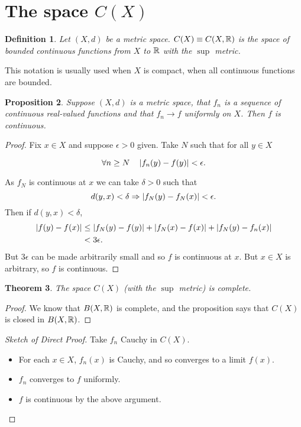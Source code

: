 \documentclass{notes}
\theoremstyle{plain}
\newtheorem{proposition}{Proposition}[chapter]
\newtheorem{theorem}[proposition]{Theorem}
\newtheorem{definition}[proposition]{Definition}
\newcommand{\Forall}[1]{\forall #1 \quad}
\begin{document}
\section{The space $C(X)$}

\begin{definition}
Let $ (X,d) $ be a metric space.
$ C(X) \equiv C(X,\mathbb{R}) $ is the space of bounded continuous functions 
from $ X $ to $ \mathbb{R} $ with the $ \sup $ metric.
\end{definition}

This notation is usually used when $ X $ is compact, when all 
continuous functions are bounded.

\begin{proposition}
Suppose $ (X,d) $ is a metric space, that $ f_{n} $ is a sequence 
of continuous real-valued functions and that $ f_{n} \to f $ 
uniformly on $ X $.  Then $ f $ is continuous.
\end{proposition}

\begin{proof}
Fix $ x \in X $ and suppose $ \epsilon > 0 $ given.
Take $ N $ such that for all $ y \in X $

\[
\Forall{n \geq N} \abs{f_{n}(y)-f(y)}< \epsilon.
\]

As $f_{N}$ is continuous at $x$ we can take $ \delta>0 $ 
such that
\[ d(y,x)< \delta \Rightarrow \left|f_{N}(y)-f_{N}(x)\right|<\epsilon. \]
Then if $ d(y,x)<\delta $,
\begin{align*}
\left|f(y)-f(x)\right| & \leq \left|f_{N}(y)-f(y)\right| + \left|f_{N}(x)-f(x)\right| + 
\left|f_{N}(y)-f_{n}(x)\right| \\
& < 3 \epsilon.
\end{align*}
But $ 3\epsilon $ can be made arbitrarily small and so $ f $ is
continuous at $ x $. But $ x \in X $ is arbitrary, so $ f $ is
continuous.
\end{proof}



\begin{theorem}
The space $ C(X) $ (with the $ \sup $ metric) is complete.
\end{theorem}
\begin{proof}
We know that $ B(X,\mathbb{R}) $ is complete, and the proposition says that $ 
C(X) $ is closed in $ B(X,\mathbb{R}) $.
\end{proof}
\begin{proof}[Sketch of Direct Proof]
Take $ f_{n} $ Cauchy in $ C(X) $.
\begin{itemize}
\item For each $ x \in X $, $ f_{n}(x) $ is Cauchy, and so 
converges to a limit $ f(x) $.

\item $ f_{n} $ converges to $ f $ uniformly.

\item  $ f $ is continuous by the above argument.
\end{itemize}
\end{proof}
\end{document}
